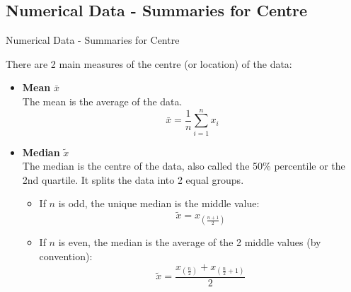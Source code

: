 \documentclass[t,xcolor=pdftex,dvipsnames,table]{beamer}
\begin{document}
\subsection[]{Numerical Data - Summaries for Centre}
\begin{frame}[fragile]{Numerical Data - Summaries for Centre}

There are 2 main measures of the centre (or location) of the data:

\begin{itemize}
\item {\bf Mean} $\bar{x}$ \\
The mean is the average of the data. \\
\[ \bar{x} = \frac{1}{n} \sum_{i=1}^{n} x_{i} \]

\item {\bf Median} $\tilde{x}$ \\
The median is the centre of the data, also called the 50\% percentile or the 2nd quartile. It splits the data into 2 equal groups.  

\begin{itemize}
\item 
If $n$ is odd, the unique median is the middle value:
\[  \tilde{x} = x_{(\frac{n+1}{2})}  \]

\item
If $n$ is even, the median is the average of the 2 middle values (by convention):
\[ \tilde{x} = \frac{x_{(\frac{n}{2})} + x_{(\frac{n}{2} + 1)}}{2} \]
\end{itemize}
\end{itemize}
\end{frame}
\end{document}
